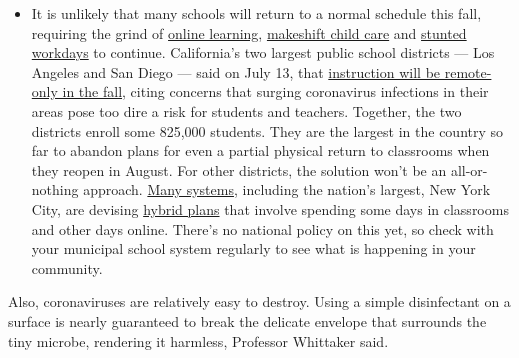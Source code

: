 \begin{itemize}
  \begin{itemize}
  \tightlist
  \item
    It is unlikely that many schools will return to a normal schedule
    this fall, requiring the grind of
    \href{https://www.nytimes.com/2020/06/05/us/coronavirus-education-lost-learning.html?action=click\&pgtype=Article\&state=default\&region=MAIN_CONTENT_3\&context=storylines_faq}{online
    learning},
    \href{https://www.nytimes.com/2020/05/29/us/coronavirus-child-care-centers.html?action=click\&pgtype=Article\&state=default\&region=MAIN_CONTENT_3\&context=storylines_faq}{makeshift
    child care} and
    \href{https://www.nytimes.com/2020/06/03/business/economy/coronavirus-working-women.html?action=click\&pgtype=Article\&state=default\&region=MAIN_CONTENT_3\&context=storylines_faq}{stunted
    workdays} to continue. California's two largest public school
    districts --- Los Angeles and San Diego --- said on July 13, that
    \href{https://www.nytimes.com/2020/07/13/us/lausd-san-diego-school-reopening.html?action=click\&pgtype=Article\&state=default\&region=MAIN_CONTENT_3\&context=storylines_faq}{instruction
    will be remote-only in the fall}, citing concerns that surging
    coronavirus infections in their areas pose too dire a risk for
    students and teachers. Together, the two districts enroll some
    825,000 students. They are the largest in the country so far to
    abandon plans for even a partial physical return to classrooms when
    they reopen in August. For other districts, the solution won't be an
    all-or-nothing approach.
    \href{https://bioethics.jhu.edu/research-and-outreach/projects/eschool-initiative/school-policy-tracker/}{Many
    systems}, including the nation's largest, New York City, are
    devising
    \href{https://www.nytimes.com/2020/06/26/us/coronavirus-schools-reopen-fall.html?action=click\&pgtype=Article\&state=default\&region=MAIN_CONTENT_3\&context=storylines_faq}{hybrid
    plans} that involve spending some days in classrooms and other days
    online. There's no national policy on this yet, so check with your
    municipal school system regularly to see what is happening in your
    community.
  \end{itemize}
\end{itemize}

Also, coronaviruses are relatively easy to destroy. Using a simple
disinfectant on a surface is nearly guaranteed to break the delicate
envelope that surrounds the tiny microbe, rendering it harmless,
Professor Whittaker said.

